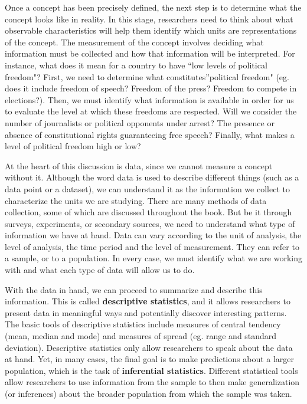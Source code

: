 \documentclass{book}
\begin{document}
Once a concept has been precisely defined, the next step is to determine what
the concept looks like in reality. In this stage, researchers need to think
about what observable characteristics will help them identify which units are
representations of the concept. The measurement of the concept involves
deciding what information must be collected and how that information will be
interpreted. For instance, what does it mean for a country to have ``low
levels of political freedom"? First, we need to determine what
constitutes''political freedom" (eg. does it include freedom of speech?
Freedom of the press? Freedom to compete in elections?). Then, we must
identify what information is available in order for us to evaluate the level
at which these freedoms are respected. Will we consider the number of
journalists or political opponents under arrest? The presence or absence of
constitutional rights guaranteeing free speech? Finally, what makes a level of
political freedom high or low?

At the heart of this discussion is data, since we cannot measure a concept
without it. Although the word data is used to describe different things (such
as a data point or a dataset), we can understand it as the information we
collect to characterize the units we are studying. There are many methods of
data collection, some of which are discussed throughout the book. But be it
through surveys, experiments, or secondary sources, we need to understand what
type of information we have at hand. Data can vary according to the unit of
analysis, the level of analysis, the time period and the level of measurement.
They can refer to a sample, or to a population. In every case, we must
identify what we are working with and what each type of data will allow us to
do.

With the data in hand, we can proceed to summarize and describe this
information. This is called \textbf{descriptive statistics}, and it allows
researchers to present data in meaningful ways and potentially discover
interesting patterns. The basic tools of descriptive statistics include
measures of central tendency (mean, median and mode) and measures of spread
(eg. range and standard deviation). Descriptive statistics only allow
researchers to speak about the data at hand. Yet, in many cases, the final
goal is to make predictions about a larger population, which is the task of
\textbf{inferential statistics}. Different statistical tools allow researchers
to use information from the sample to then make generalization (or inferences)
about the broader population from which the sample was taken.
\end{document}
